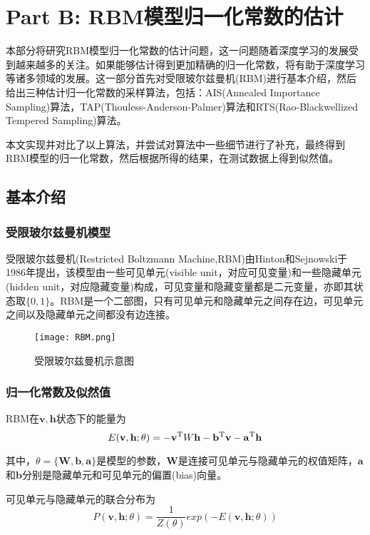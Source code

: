 \documentclass[11pt]{article}
\begin{document}
\newpage

\section{Part B: RBM模型归一化常数的估计}
本部分将研究RBM模型归一化常数的估计问题，这一问题随着深度学习的发展受到越来越多的关注\cite{AIS}。如果能够估计得到更加精确的归一化常数，将有助于深度学习等诸多领域的发展。这一部分首先对受限玻尔兹曼机(RBM)进行基本介绍，然后给出三种估计归一化常数的采样算法，包括：AIS(Annealed Importance Sampling)算法，TAP(Thouless-Anderson-Palmer)算法和RTS(Rao-Blackwellized Tempered Sampling)算法。

本文实现并对比了以上算法，并尝试对算法中一些细节进行了补充，最终得到RBM模型的归一化常数，然后根据所得的结果，在测试数据上得到似然值。

\subsection{基本介绍}
\subsubsection{受限玻尔兹曼机模型}
受限玻尔兹曼机(Restricted Boltzmann Machine,RBM)由Hinton和Sejnowski于1986年提出\cite{RBM}，该模型由一些可见单元(visible unit，对应可见变量)和一些隐藏单元(hidden unit，对应隐藏变量)构成，可见变量和隐藏变量都是二元变量，亦即其状态取$\{0,1\}$。RBM是一个二部图，只有可见单元和隐藏单元之间存在边，可见单元之间以及隐藏单元之间都没有边连接。

\begin{figure}[h]
    \centering
    \texttt{[image: RBM.png]}
    \caption{\scriptsize{受限玻尔兹曼机示意图}}
    \label{RBM}
\end{figure}


\subsubsection{归一化常数及似然值}
RBM在${\mathbf{v},\mathbf{h}}$状态下的能量为
\[E(\mathbf{v},\mathbf{h};\theta) = -\mathbf{v}^{\rm T}W\mathbf{h}-\mathbf{b}^{\rm T}\mathbf{v} - \mathbf{a}^{\rm T}\mathbf{h}\]

其中，$\theta = \{\mathbf{W},\mathbf{b},\mathbf{a}\}$是模型的参数，$\mathbf{W}$是连接可见单元与隐藏单元的权值矩阵，$\mathbf{a}$和$\mathbf{b}$分别是隐藏单元和可见单元的偏置(bias)向量。\cite{AIS}

可见单元与隐藏单元的联合分布为
\[P(\mathbf{v},\mathbf{h};\theta) = \frac{1}{Z(\theta)} exp(-E(\mathbf{v},\mathbf{h};\theta))\]
\end{document}
